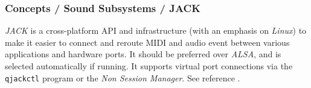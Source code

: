 \subsubsection{Concepts / Sound Subsystems / JACK}
\label{subsubsec:concepts_sound_jack}

   \textsl{JACK} is a cross-platform
   API and infrastructure
   (with an emphasis on \textsl{Linux})
   to make it easier to connect and reroute MIDI
   and audio event between various applications and hardware ports.
   It should be preferred over \textsl{ALSA}, and is selected automatically if
   running.
   It supports virtual port connections via the \texttt{qjackctl} program or
   the \textsl{Non Session Manager}.
   See reference \cite{jack}.

